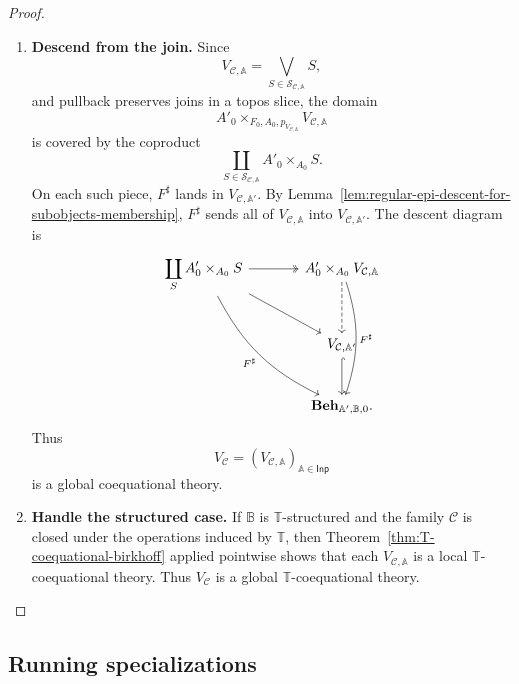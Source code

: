 \begin{proof}
\begin{enumerate}
        \item \textbf{Descend from the join.}
        Since
        \[
            V_{\mathcal C,\mathbb A}
            =
            \bigvee_{S\in\mathcal S_{\mathcal C,\mathbb A}}S,
        \]
        and pullback preserves joins in a topos slice, the domain
        \[
            A'_0\times_{F_0,A_0,p_{V_{\mathcal C,\mathbb A}}}
            V_{\mathcal C,\mathbb A}
        \]
        is covered by the coproduct
        \[
            \coprod_{S\in\mathcal S_{\mathcal C,\mathbb A}}
            A'_0\times_{A_0}S.
        \]
        On each such piece, \(F^\sharp\) lands in
        \(V_{\mathcal C,\mathbb A'}\). By
        Lemma~\ref{lem:regular-epi-descent-for-subobjects-membership},
        \(F^\sharp\) sends all of \(V_{\mathcal C,\mathbb A}\) into
        \(V_{\mathcal C,\mathbb A'}\). The descent diagram is
        \[
        \begin{tikzcd}[column sep=large, row sep=large]
            \displaystyle
            \coprod_S A'_0\times_{A_0}S
                \arrow[r, two heads]
                \arrow[dr]
                \arrow[ddr, bend right=18, "F^\sharp"']
            &
            A'_0\times_{A_0}V_{\mathcal C,\mathbb A}
                \arrow[d, dashed]
                \arrow[dd, bend left=18, "F^\sharp"]
            \\
            &
            V_{\mathcal C,\mathbb A'}
                \arrow[d, hook]
            \\
            &
            \mathbf{Beh}_{\mathbb A',\mathbb B,0}.
        \end{tikzcd}
        \]
        Thus
        \[
            V_{\mathcal C}
            =
            (V_{\mathcal C,\mathbb A})_{\mathbb A\in\mathsf{Inp}}
        \]
        is a global coequational theory.

        \item \textbf{Handle the structured case.}
        If \(\mathbb B\) is \(\mathbb T\)-structured and the family
        \(\mathcal C\) is closed under the operations induced by
        \(\mathbb T\), then
        Theorem~\ref{thm:T-coequational-birkhoff} applied pointwise shows that
        each \(V_{\mathcal C,\mathbb A}\) is a local
        \(\mathbb T\)-coequational theory. Thus \(V_{\mathcal C}\) is a global
        \(\mathbb T\)-coequational theory.
    \end{enumerate}
\end{proof}

\subsection{Running specializations}
\label{subsec:global-birkhoff-running-specializations}

